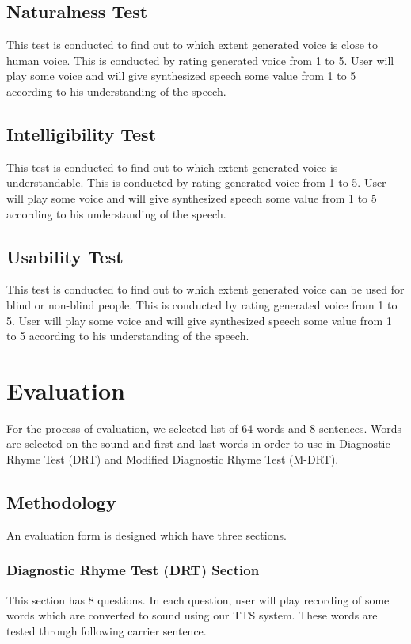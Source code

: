 \subsection{Naturalness Test}
This test is conducted to find out to which extent generated voice is close to human voice. This is conducted by rating generated voice from 1 to 5. User will play some voice and will give synthesized speech some value from 1 to 5 according to his understanding of the speech.

\subsection{Intelligibility Test}
This test is conducted to find out to which extent generated voice is understandable. This is conducted by rating generated voice from 1 to 5. User will play some voice and will give synthesized speech some value from 1 to 5 according to his understanding of the speech.

\subsection{Usability Test}
This test is conducted to find out to which extent generated voice can be used for blind or non-blind people. This is conducted by rating generated voice from 1 to 5. User will play some voice and will give synthesized speech some value from 1 to 5 according to his understanding of the speech.


\section{Evaluation}
For the process of evaluation, we selected list of 64 words and 8 sentences. Words are selected on the sound and first and last words in order to use in Diagnostic Rhyme Test (DRT) and Modified Diagnostic Rhyme Test (M-DRT).

\subsection{Methodology}
An evaluation form is designed which have three sections. 


\subsubsection{Diagnostic Rhyme Test (DRT) Section}

This section has 8 questions. In each question, user will play recording of some words which are converted to sound using our TTS system. These words are tested through following carrier sentence.

